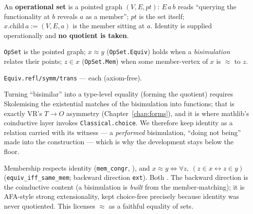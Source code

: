 An \textbf{operational set} is a pointed graph $(V, E, \mathit{pt})$: $E\,a\,b$
reads ``querying the functionality at $b$ reveals $a$ as a member'';
$\mathit{pt}$ is the set itself; $x.\mathrm{child}\,a := (V,E,a)$ is the member
sitting at $a$.  Identity is supplied operationally and \textbf{no quotient is
taken}.

\begin{definition}
\label{def:setsop_opset}
\leanok
\texttt{OpSet} is the pointed graph; $x \approx y$ (\texttt{OpSet.Equiv}) holds
when a \emph{bisimulation} relates their points; $z \in x$ (\texttt{OpSet.Mem})
when some member-vertex of $x$ is $\approx$ to $z$.
\end{definition}

\begin{theorem}
\label{thm:setsop_equiv}
\leanok
\texttt{Equiv.refl/symm/trans} --- each \axiomprofile{[]} (axiom-free).
\end{theorem}

Turning ``bisimilar'' into a type-level equality (forming the quotient) requires
Skolemising the existential matches of the bisimulation into functions; that is
exactly VR's $T\!\to\!O$ asymmetry (Chapter~\ref{chap:forms}), and it is where
mathlib's coinductive layer invokes \texttt{Classical.choice}.  We therefore keep
identity as a relation carried with its witness --- a \emph{performed}
bisimulation, ``doing not being'' made into the construction --- which is why the
development stays below the floor.

\begin{theorem}
\label{thm:setsop_ext}
\leanok
{}
Membership respects identity (\texttt{mem\_congr}, \axiomprofile{[]}), and
$x \approx y \iff \forall z,\ (z\in x \leftrightarrow z\in y)$
(\texttt{equiv\_iff\_same\_mem}; backward direction \texttt{ext}).  Both
\axiomprofile{[]}.  The backward direction is the coinductive content (a
bisimulation is \emph{built} from the member-matching); it is AFA-style strong
extensionality, kept choice-free precisely because identity was never
quotiented.  This licenses $\approx$ as a faithful equality of sets.
\end{theorem}

